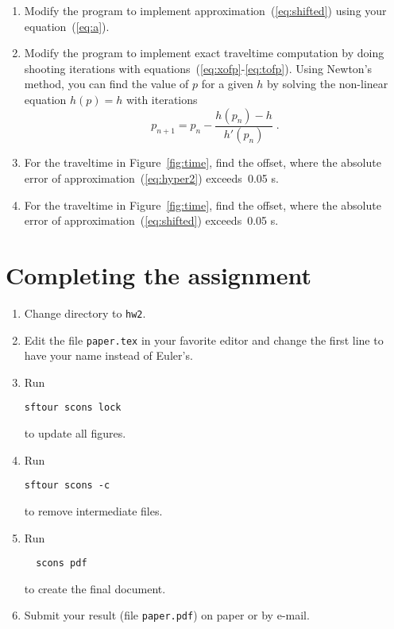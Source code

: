 \begin{enumerate}
\item Modify the program to implement approximation~(\ref{eq:shifted}) using your equation~(\ref{eq:a}).
\item Modify the program to implement exact traveltime computation by doing shooting iterations with equations~(\ref{eq:xofp}-\ref{eq:tofp}). 
Using Newton's method, you can find the value of $p$ for a given $h$ by solving the non-linear equation $h(p)=h$ with iterations
\begin{equation}
\label{eq:newton2}
p_{n+1} = p_n - \frac{h(p_n)-h}{h'(p_n)}\;.
\end{equation}
\item For the traveltime in Figure~\ref{fig:time}, find the offset, where the absolute error of approximation~(\ref{eq:hyper2}) exceeds~0.05 s. 
\item For the traveltime in Figure~\ref{fig:time}, find the offset, where the absolute error of approximation~(\ref{eq:shifted}) exceeds~0.05 s. 
\end{enumerate}

\lstset{language=c,numbers=left,numberstyle=\tiny,showstringspaces=false}


\lstset{language=fortran,numbers=left,numberstyle=\tiny,showstringspaces=false}


\newpage

\section{Completing the assignment}

\begin{enumerate}
\item Change directory to \verb#hw2#.
\item Edit the file \texttt{paper.tex} in your favorite editor and change the
  first line to have your name instead of Euler's.
\item Run
\begin{verbatim}
sftour scons lock
\end{verbatim}
to update all figures.
\item Run
\begin{verbatim}
sftour scons -c
\end{verbatim}
to remove intermediate files.
\item Run
\begin{verbatim} 
  scons pdf
\end{verbatim}
  to create the final document.
\item Submit your result (file \texttt{paper.pdf}) on paper or by
  e-mail. 
\end{enumerate}


 

